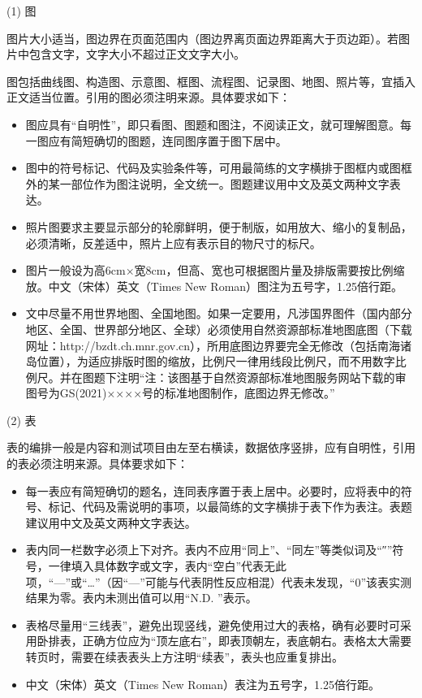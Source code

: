 {{(1) 图}

图片大小适当，图边界在页面范围内（图边界离页面边界距离大于页边距）。若图片中包含文字，文字大小不超过正文文字大小。

图包括曲线图、构造图、示意图、框图、流程图、记录图、地图、照片等，宜插入正文适当位置。引用的图必须注明来源。具体要求如下：
\begin{itemize}
    \item 图应具有“自明性”，即只看图、图题和图注，不阅读正文，就可理解图意。每一图应有简短确切的图题，连同图序置于图下居中。
    \item 图中的符号标记、代码及实验条件等，可用最简练的文字横排于图框内或图框外的某一部位作为图注说明，全文统一。图题建议用中文及英文两种文字表达。
    \item 照片图要求主要显示部分的轮廓鲜明，便于制版，如用放大、缩小的复制品，必须清晰，反差适中，照片上应有表示目的物尺寸的标尺。
    \item 图片一般设为高6cm×宽8cm，但高、宽也可根据图片量及排版需要按比例缩放。中文（宋体）英文（Times New Roman）图注为五号字，1.25倍行距。
    \item 文中尽量不用世界地图、全国地图。如果一定要用，凡涉国界图件（国内部分地区、全国、世界部分地区、全球）必须使用自然资源部标准地图底图（下载网址：http://bzdt.ch.mnr.gov.cn），所用底图边界要完全无修改（包括南海诸岛位置），为适应排版时图的缩放，比例尺一律用线段比例尺，而不用数字比例尺。并在图题下注明“注：该图基于自然资源部标准地图服务网站下载的审图号为GS(2021)××××号的标准地图制作，底图边界无修改。”
\end{itemize}


{(2) 表}

表的编排一般是内容和测试项目由左至右横读，数据依序竖排，应有自明性，引用的表必须注明来源。具体要求如下：
\begin{itemize}
    \item 每一表应有简短确切的题名，连同表序置于表上居中。必要时，应将表中的符号、标记、代码及需说明的事项，以最简练的文字横排于表下作为表注。表题建议用中文及英文两种文字表达。
    \item 表内同一栏数字必须上下对齐。表内不应用“同上”、“同左”等类似词及“″”符号，一律填入具体数字或文字，表内“空白”代表无此项，“—”或“…”（因“—”可能与代表阴性反应相混）代表未发现，“0”该表实测结果为零。表内未测出值可以用“N.D. ”表示。
    \item 表格尽量用“三线表”，避免出现竖线，避免使用过大的表格，确有必要时可采用卧排表，正确方位应为“顶左底右”，即表顶朝左，表底朝右。表格太大需要转页时，需要在续表表头上方注明“续表”，表头也应重复排出。
    \item 中文（宋体）英文（Times New Roman）表注为五号字，1.25倍行距。
\end{itemize}

}
